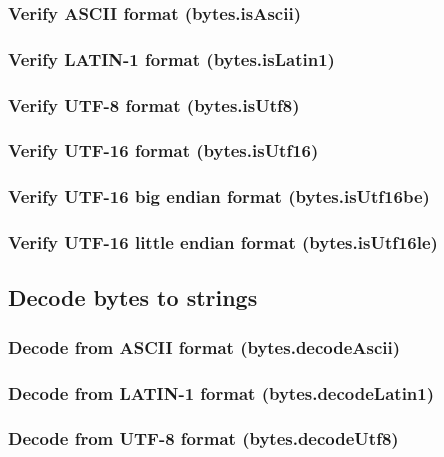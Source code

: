 \documentclass{article}
\theoremstyle{definition}
\begin{document}
\subsubsection{Verify ASCII format (bytes.isAscii)}

\subsubsection{Verify LATIN-1 format (bytes.isLatin1)}

\subsubsection{Verify UTF-8 format (bytes.isUtf8)}

\subsubsection{Verify UTF-16 format (bytes.isUtf16)}

\subsubsection{Verify UTF-16 big endian format (bytes.isUtf16be)}

\subsubsection{Verify UTF-16 little endian format (bytes.isUtf16le)}

\subsection{Decode bytes to strings}

\subsubsection{Decode from ASCII format (bytes.decodeAscii)}

\subsubsection{Decode from LATIN-1 format (bytes.decodeLatin1)}

\subsubsection{Decode from UTF-8 format (bytes.decodeUtf8)}
\end{document}

